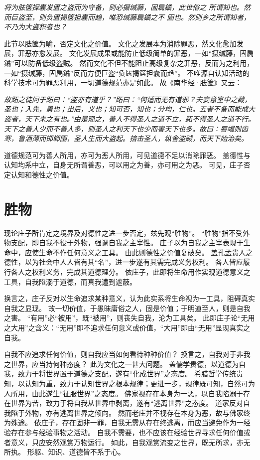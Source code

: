 \documentclass[11pt]{article}
\begin{document}
\textit{将为胠箧探囊发匮之盗而为守备，则必摄缄藤，固扃鐍，此世俗之 所谓知也。然而巨盗至，则负匮揭箧担囊而趋，唯恐缄藤扃鐍之不 固也。然则乡之所谓知者，不乃为大盗积者也？}

此节以胠箧为喻，否定文化之价值。
文化之发展本为消除罪恶，然文化愈加发展，罪恶亦愈发展。
文化发展成果或能防止低级简单的罪恶，一如“摄缄藤，固扃鐍”可以防备低级盗贼。
然而文化不但不能阻止高级复杂之罪恶，反而为之利用，一如“摄缄藤，固扃鐍”反而方便巨盗“负匮揭箧担囊而趋”。
不唯源自认知活动的科学技术可为罪恶利用，一切道德规范亦是如此。
故《南华经·胠箧》又云：

\textit{故跖之徒问于跖曰：“盗亦有道乎？”跖曰：“何适而无有道邪？夫妄意室中之藏，圣也；入先，勇也；出后，义也；知可否，知也；分均，仁也。五者不备而能成大盗者，天下未之有也。”由是观之，善人不得圣人之道不立，跖不得圣人之道不行。天下之善人少而不善人多，则圣人之利天下也少而害天下也多。故曰：唇竭则齿寒，鲁酒薄而邯郸围，圣人生而大盗起。掊击圣人，纵舍盗贼，而天下始治矣。}

道德规范可为善人所用，亦可为恶人所用，可见道德不足以消除罪恶。
盖德性与认知均系中立，自身无所谓善恶，可以用之为善，亦可用之为恶。
可见，庄子否定认知和德性之价值。

\section{胜物}
现论庄子所肯定之境界及对德性之进一步否定，兹先观“胜物”。
“胜物”指不受外物支配，即自我不役于外物，强调自我之主宰性。
庄子以为自我之主宰表现于生命中，应使生命不作任何意义之工具。
由此则德性之价值复破矣。
盖孔孟贵人之德性，以为社会中人人皆有其“名”，进一步遂有其需完成义务权利。
各人皆应履行各人之权利义务，完成其道德理分。
依庄子，此即将生命用作实现道德意义之工具，自我陷溺于道德，而真我遭到遮蔽。

\newline

换言之，庄子反对以生命追求某种意义，认为此实系将生命视为一工具，阻碍真实自我之显现。
故一切价值，于愚昧庸俗之人，固是价值；于明道至人，则是自我之害。
“有用”必“被用”，既“被用”，则丧失自我，沦为工具矣。
此即庄子论“无用之大用”之含义：“无用”即不追求任何意义或价值，“大用”即由“无用”显现真实之自我。

\newline

自我不应追求任何价值，则自我应当如何看待种种价值？
换言之，自我对于非我之世界，应当持何种态度？
此为文化之一甚大问题。
盖儒学贵德，以道德为自我，致力于将世界置于道德之支配，遂有“化成世界”之态度。
希腊哲学传统贵知，以认知为重，致力于认知世界之根本规律；更进一步，规律既可知，自然可为人所用，由此遂生“征服世界”之态度。
佛家视存在本身为一恶，以自我陷溺于存在世界为苦，致力于将自我从世界中剥离，遂有“逃离世界”之态度。
道家反对自我陷于外物，亦有逃离世界之倾向。
然而老庄并不视存在本身为恶，故与佛家终为殊途。
依庄子，存在固非一罪，自我无需从存在终逃离，而应当避免作为一经验存在参与经验事物之活动。
自我不需要，也不应该在经验世界寻求任何价值或者意义，只应安然观赏万物运行。
如此，自我观赏流变之世界，既无所求，亦无所执。
形躯、知识、道德皆不系于心。
\end{document}

